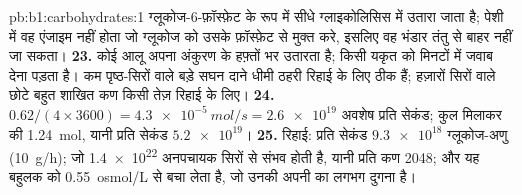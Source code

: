 \begin{solution}{pb:b1:carbohydrates:1}
ग्लूकोज-6-फ़ॉस्फ़ेट के रूप में सीधे ग्लाइकोलिसिस में उतारा जाता है; पेशी
में वह एंजाइम नहीं होता जो ग्लूकोज को उसके फ़ॉस्फ़ेट से मुक्त करे, इसलिए
वह भंडार तंतु से बाहर नहीं जा सकता।
\textbf{23.} कोई आलू अपना  अंकुरण के हफ़्तों भर उतारता है; किसी
यकृत को मिनटों में जवाब देना पड़ता है। कम पृष्ठ-सिरों वाले बड़े सघन दाने
धीमी ठहरी रिहाई के लिए ठीक हैं; हज़ारों सिरों वाले छोटे बहुत शाखित कण
किसी तेज़ रिहाई के लिए।
\textbf{24.} $0.62/(4\times 3600) = \qty{4.3e-5}{mol/s} = \num{2.6e19}$
अवशेष प्रति सेकंड; कुल मिलाकर  की \qty{1.24}{mol}, यानी प्रति
सेकंड $\num{5.2e19}$।
\textbf{25.} रिहाई: प्रति सेकंड $\num{9.3e18}$ ग्लूकोज-अणु
(\qty{10}{g/h}); जो \num{1.4e22} अनपचायक सिरों से संभव होती है, यानी
प्रति कण \num{2048}; और यह बहुलक  को \qty{0.55}{osmol/L} से
बचा लेता है, जो उनकी अपनी  का लगभग दुगना है।
\end{solution}
